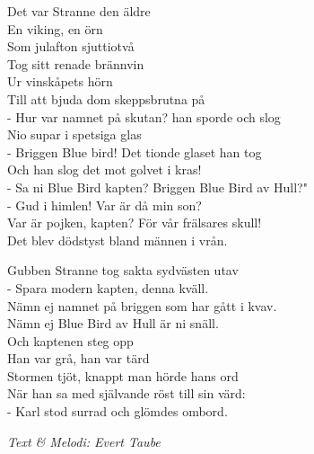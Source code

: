 \vspace{10pt}
Det var Stranne den äldre\\
En viking, en örn\\
Som julafton sjuttiotvå\\
Tog sitt renade brännvin\\
Ur vinskåpets hörn\\
Till att bjuda dom skeppsbrutna på\\
- Hur var namnet på skutan?
han sporde och slog\\
Nio supar i spetsiga glas\\
- Briggen Blue bird!
Det tionde glaset han tog\\
Och han slog det mot golvet i kras!\\
- Sa ni Blue Bird kapten? Briggen Blue Bird av Hull?"\\
- Gud i himlen! Var är då min son?\\
Var är pojken, kapten? För vår frälsares skull!\\
Det blev dödstyst bland männen i vrån.\par
\vspace{10pt}
Gubben Stranne tog sakta sydvästen utav\\
- Spara modern kapten, denna kväll.\\
Nämn ej namnet på briggen som har gått i kvav.\\
Nämn ej Blue Bird av Hull är ni snäll.\\
Och kaptenen steg opp\\
Han var grå, han var tärd\\
Stormen tjöt, knappt man hörde hans ord\\
När han sa med självande röst till sin värd:\\
- Karl stod surrad och glömdes ombord.\par
\vspace{10pt}
{\footnotesize\textit{Text \& Melodi: Evert Taube}}
